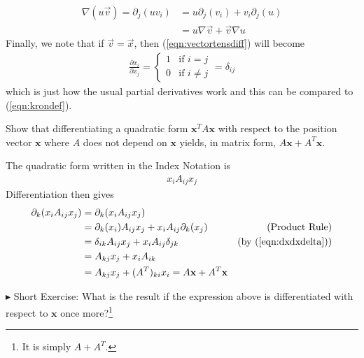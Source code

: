 \begin{align*}
\nabla(u\vec{v}) = \partial_j(uv_i) &= u\partial_j(v_i) + v_i\partial_j(u) \\
&= u \nabla \vec{v} + \vec{v}\nabla u
\end{align*}
Finally, we note that if $\vec{v} = \vec{x}$, then (\ref{eqn:vectortensdiff}) will become
\begin{align}
\frac{\partial x_i}{\partial x_j} = \begin{cases}
1 & \text{if $i=j$} \\
0 & \text{if $i\neq j$}
\end{cases} = \delta_{ij}
\label{eqn:dxdxdelta}
\end{align}
which is just how the usual partial derivatives work and this can be compared to (\ref{eqn:krondef}).
\begin{exmp}
Show that differentiating a quadratic form $\textbf{x}^TA\textbf{x}$ with respect to the position vector $\textbf{x}$ where $A$ does not depend on $\textbf{x}$ yields, in matrix form, $A\textbf{x} + A^T\textbf{x}$.
\end{exmp}
\begin{solution}
The quadratic form written in the Index Notation is
\begin{align*}
x_iA_{ij}x_j
\end{align*}
Differentiation then gives
\begin{align*}
\partial_k (x_iA_{ij}x_j) &= \partial_k (x_iA_{ij}x_j) \\
&= \partial_k (x_i) A_{ij}x_j + x_iA_{ij} \partial_k (x_j) & \text{(Product Rule)} \\
&= \delta_{ik} A_{ij}x_j + x_iA_{ij} \delta_{jk} & \text{(by (\ref{eqn:dxdxdelta}))} \\
&= A_{kj}x_j + x_iA_{ik} \\
&= A_{kj}x_j + (A^T)_{ki}x_i = A\textbf{x} + A^T\textbf{x}
\end{align*}
\end{solution}
$\blacktriangleright$ Short Exercise: What is the result if the expression above is differentiated with respect to $\textbf{x}$ once more?\footnote{It is simply $A+A^T$.}

